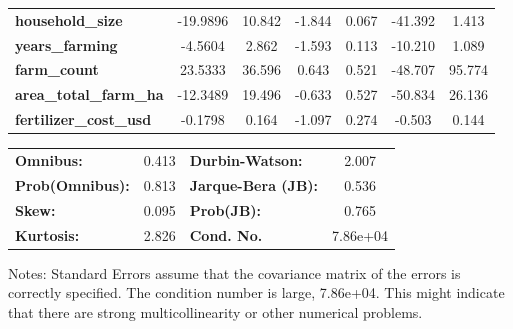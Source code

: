 \begin{center}
\begin{tabular}{lcccccc}
\textbf{household\_size}                &     -19.9896  &       10.842     &    -1.844  &         0.067        &      -41.392    &        1.413     \\
\textbf{years\_farming}                 &      -4.5604  &        2.862     &    -1.593  &         0.113        &      -10.210    &        1.089     \\
\textbf{farm\_count}                    &      23.5333  &       36.596     &     0.643  &         0.521        &      -48.707    &       95.774     \\
\textbf{area\_total\_farm\_ha}          &     -12.3489  &       19.496     &    -0.633  &         0.527        &      -50.834    &       26.136     \\
\textbf{fertilizer\_cost\_usd}          &      -0.1798  &        0.164     &    -1.097  &         0.274        &       -0.503    &        0.144     \\
\bottomrule
\end{tabular}
\begin{tabular}{lclc}
\textbf{Omnibus:}       &  0.413 & \textbf{  Durbin-Watson:     } &    2.007  \\
\textbf{Prob(Omnibus):} &  0.813 & \textbf{  Jarque-Bera (JB):  } &    0.536  \\
\textbf{Skew:}          &  0.095 & \textbf{  Prob(JB):          } &    0.765  \\
\textbf{Kurtosis:}      &  2.826 & \textbf{  Cond. No.          } & 7.86e+04  \\
\bottomrule
\end{tabular}
\end{center}

Notes: \newline
 [1] Standard Errors assume that the covariance matrix of the errors is correctly specified. \newline
 [2] The condition number is large, 7.86e+04. This might indicate that there are \newline
 strong multicollinearity or other numerical problems.